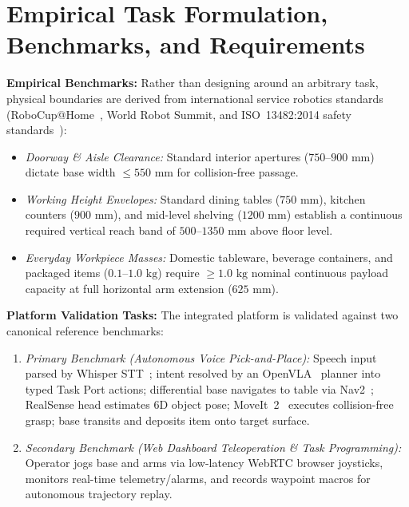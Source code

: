 \documentclass[10pt,a4paper]{article}
\begin{document}
\vspace{-0.4em}
\section{Empirical Task Formulation, Benchmarks, and Requirements}
\label{sec:tasks_reqs}
\vspace{-0.2em}
\textbf{Empirical Benchmarks:} Rather than designing around an arbitrary task, physical boundaries are derived from international service robotics standards (RoboCup@Home~\cite{robocupathome}, World Robot Summit, and ISO~13482:2014 safety standards~\cite{iso13482}):
\begin{itemize}[leftmargin=1.2em,noitemsep,topsep=1pt]
  \item \emph{Doorway \& Aisle Clearance:} Standard interior apertures ($750\text{--}900\text{ mm}$) dictate base width $\le 550\text{ mm}$ for collision-free passage.
  \item \emph{Working Height Envelopes:} Standard dining tables ($750\text{ mm}$), kitchen counters ($900\text{ mm}$), and mid-level shelving ($1200\text{ mm}$) establish a continuous required vertical reach band of $500\text{--}1350\text{ mm}$ above floor level.
  \item \emph{Everyday Workpiece Masses:} Domestic tableware, beverage containers, and packaged items ($0.1\text{--}1.0\text{ kg}$) require $\ge 1.0\text{ kg}$ nominal continuous payload capacity at full horizontal arm extension ($625\text{ mm}$).
\end{itemize}

\textbf{Platform Validation Tasks:} The integrated platform is validated against two canonical reference benchmarks:
\begin{enumerate}[leftmargin=1.2em,noitemsep,topsep=1pt]
  \item \emph{Primary Benchmark (Autonomous Voice Pick-and-Place):} Speech input parsed by Whisper STT~\cite{whisper}; intent resolved by an OpenVLA~\cite{openvla} planner into typed Task Port actions; differential base navigates to table via Nav2~\cite{nav2}; RealSense head estimates 6D object pose; MoveIt~2~\cite{moveit2} executes collision-free grasp; base transits and deposits item onto target surface.
  \item \emph{Secondary Benchmark (Web Dashboard Teleoperation \& Task Programming):} Operator jogs base and arms via low-latency WebRTC browser joysticks, monitors real-time telemetry/alarms, and records waypoint macros for autonomous trajectory replay.
\end{enumerate}
\end{document}
